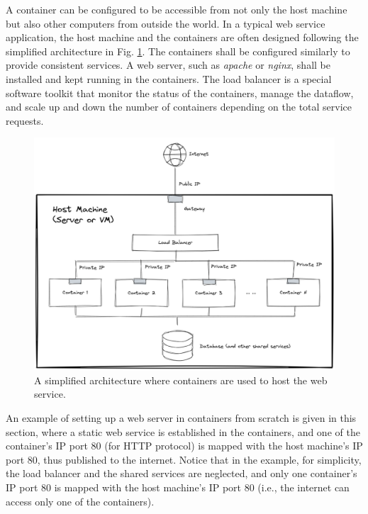 A container can be configured to be accessible from not only the host machine but also other computers from outside the world. In a typical web service application, the host machine and the containers are often designed following the simplified architecture in Fig. \ref{chvirtualizationandcontainerization:fig:containerwebserverarchitecture}. The containers shall be configured similarly to provide consistent services. A web server, such as \textit{apache} or \textit{nginx}, shall be installed and kept running in the containers. The load balancer is a special software toolkit that monitor the status of the containers, manage the dataflow, and scale up and down the number of containers depending on the total service requests.
\begin{figure}
	\centering
	\includegraphics[width=350pt]{chapters/ch_virtualization_and_containerization/figures/containerwebserverarchitecture.png}
	\caption{A simplified architecture where containers are used to host the web service.} \label{chvirtualizationandcontainerization:fig:containerwebserverarchitecture}
\end{figure}

An example of setting up a web server in containers from scratch is given in this section, where a static web service is established in the containers, and one of the container's IP port 80 (for HTTP protocol) is mapped with the host machine's IP port 80, thus published to the internet. Notice that in the example, for simplicity, the load balancer and the shared services are neglected, and only one container's IP port 80 is mapped with the host machine's IP port 80 (i.e., the internet can access only one of the containers).


